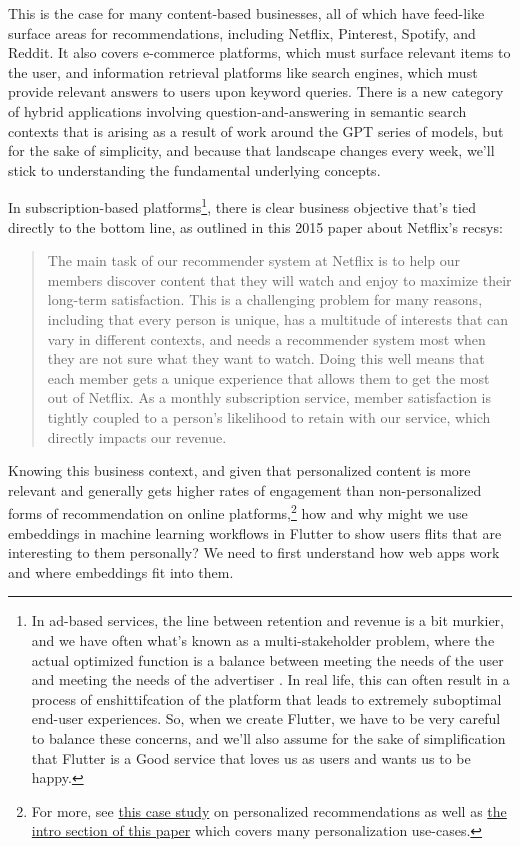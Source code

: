 \documentclass[11pt, table]{diazessay} %
\begin{document}
\begin{sloppypar}
This is the case for many content-based businesses, all of which have feed-like surface areas for recommendations, including Netflix, Pinterest, Spotify, and Reddit.  It also covers e-commerce platforms, which must surface relevant items to the user, and information retrieval platforms like search engines, which must provide relevant answers to users upon keyword queries. There is a new category of hybrid applications involving question-and-answering in semantic search contexts that is arising as a result of work around the GPT series of models, but for the sake of simplicity, and because that landscape changes every week, we'll stick to understanding the fundamental underlying concepts.

In subscription-based platforms\footnote{In ad-based services, the line between retention and revenue is a bit murkier, and we have often what's known as a multi-stakeholder problem, where the actual optimized function is a balance between meeting the needs of the user and meeting the needs of the advertiser \citep{zheng2017multi}.  In real life, this can often result in a process of enshittifcation \citep{doctorow_2023} of the platform that leads to extremely suboptimal end-user experiences. So, when we create Flutter, we have to be very careful to balance these concerns, and we'll also assume for the sake of simplification that Flutter is a Good service that loves us as users and wants us to be happy.}, there is clear business objective that's tied directly to the bottom line, as outlined in this 2015 paper  \citep{steck2021deep}  about Netflix's recsys:

\begin{quote}

The main task of our recommender system at Netflix is to help our members discover content that they will watch and enjoy to maximize their long-term satisfaction. This is a challenging problem for many reasons, including that every person is unique, has a multitude of interests that can vary in different contexts, and needs a recommender system most when they are not sure what they want to watch. Doing this well means that each member gets a unique experience that allows them to get the most out of Netflix. As a monthly subscription service, member satisfaction is tightly coupled to a person’s likelihood to retain with our service, which directly impacts our revenue.
\end{quote}

Knowing this business context, and given that personalized content is more relevant and generally gets higher rates of engagement \citep{jannach2010recommender} than non-personalized forms of recommendation on online platforms,\footnote{For more, see  \href{http://www.recommenderbook.net/media/Recommender_Systems_An_Introduction_Chapter08_Case_study.pdf}{this case study} on personalized recommendations as well as \href{https://www.arxiv-vanity.com/papers/1906.03109/}{the intro section of this paper} which covers many personalization use-cases.}  how and why might we use embeddings in machine learning workflows in Flutter to show users flits that are interesting to them personally? We need to first understand how web apps work and where embeddings fit into them.


\end{sloppypar}
\end{document}
